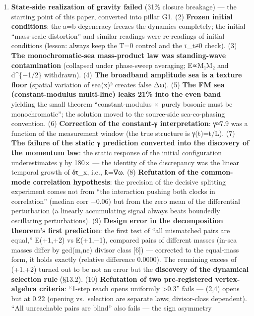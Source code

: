 \documentclass[
]{article}
\providecommand{\tightlist}{%
  \setlength{\itemsep}{0pt}\setlength{\parskip}{0pt}}
\begin{document}
\begin{enumerate}
\def\labelenumi{(\arabic{enumi})}
\tightlist
\item
  \textbf{State-side realization of gravity failed} (31\% closure
  breakage) --- the starting point of this paper, converted into pillar
  G1. (2) \textbf{Frozen initial conditions}: the a=b degeneracy freezes
  the dynamics completely; the initial ``mass-scale distortion'' and
  similar readings were re-readings of initial conditions (lesson:
  always keep the T=0 control and the τ\_t≠0 check). (3) \textbf{The
  monochromatic-sea mass-product law was standing-wave contamination}
  (collapsed under phase-sweep averaging; E∝M₁M₂ and d\^{}\{−1/2\}
  withdrawn). (4) \textbf{The broadband amplitude sea is a texture
  floor} (spatial variation of \textbar sea(x)\textbar² creates false
  Δω). (5) \textbf{The FM sea (constant-modulus multi-line) leaks 21\%
  into the even band} --- yielding the small theorem ``constant-modulus
  × purely bosonic must be monochromatic''; the solution moved to the
  source-side sea-co-phasing convention. (6) \textbf{Correction of the
  constant-γ interpretation}: γ≈7.9 was a function of the measurement
  window (the true structure is γ(t)=t/L). (7) \textbf{The failure of
  the static γ prediction converted into the discovery of the momentum
  law}: the static response of the initial configuration underestimates
  γ by 180× --- the identity of the discrepancy was the linear temporal
  growth of δτ\_x, i.e., k̇=∇ω. (8) \textbf{Refutation of the common-mode
  correlation hypothesis}: the precision of the decisive splitting
  experiment comes not from ``the interaction pushing both clocks in
  correlation'' (median corr −0.06) but from the zero mean of the
  differential perturbation (a linearly accumulating signal always beats
  boundedly oscillating perturbations). (9) \textbf{Design error in the
  decomposition theorem's first prediction}: the first test of ``all
  mismatched pairs are equal,'' E(+1,+2) vs E(+1,−1), compared pairs of
  different masses (in-sea masses differ by gcd(m,ne) divisor class
  {[}6{]}) --- corrected to the equal-mass form, it holds exactly
  (relative difference 0.0000). The remaining excess of (+1,+2) turned
  out to be not an error but the \textbf{discovery of the dynamical
  selection rule} (§13.2). (10) \textbf{Refutation of two pre-registered
  vertex-algebra criteria}: ``1-step reach opens uniformly
  \textgreater0.3'' fails --- (2,4) opens but at 0.22 (opening
  vs.~selection are separate laws; divisor-class dependent). ``All
  unreachable pairs are blind'' also fails --- the sign asymmetry

\end{enumerate}
\end{document}
